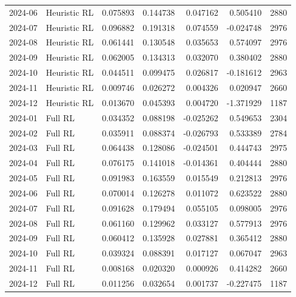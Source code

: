 \begin{tabular}{llrrrrr}
2024-06 & Heuristic RL & 0.075893 & 0.144738 & 0.047162 & 0.505410 & 2880 \\
2024-07 & Heuristic RL & 0.096882 & 0.191318 & 0.074559 & -0.024748 & 2976 \\
2024-08 & Heuristic RL & 0.061441 & 0.130548 & 0.035653 & 0.574097 & 2976 \\
2024-09 & Heuristic RL & 0.062005 & 0.134313 & 0.032070 & 0.380402 & 2880 \\
2024-10 & Heuristic RL & 0.044511 & 0.099475 & 0.026817 & -0.181612 & 2963 \\
2024-11 & Heuristic RL & 0.009746 & 0.026272 & 0.004326 & 0.020947 & 2660 \\
2024-12 & Heuristic RL & 0.013670 & 0.045393 & 0.004720 & -1.371929 & 1187 \\
2024-01 & Full RL & 0.034352 & 0.088198 & -0.025262 & 0.549653 & 2304 \\
2024-02 & Full RL & 0.035911 & 0.088374 & -0.026793 & 0.533389 & 2784 \\
2024-03 & Full RL & 0.064438 & 0.128086 & -0.024501 & 0.444743 & 2975 \\
2024-04 & Full RL & 0.076175 & 0.141018 & -0.014361 & 0.404444 & 2880 \\
2024-05 & Full RL & 0.091983 & 0.163559 & 0.015549 & 0.212813 & 2976 \\
2024-06 & Full RL & 0.070014 & 0.126278 & 0.011072 & 0.623522 & 2880 \\
2024-07 & Full RL & 0.091628 & 0.179494 & 0.055105 & 0.098005 & 2976 \\
2024-08 & Full RL & 0.061160 & 0.129962 & 0.033127 & 0.577913 & 2976 \\
2024-09 & Full RL & 0.060412 & 0.135928 & 0.027881 & 0.365412 & 2880 \\
2024-10 & Full RL & 0.039324 & 0.088391 & 0.017127 & 0.067047 & 2963 \\
2024-11 & Full RL & 0.008168 & 0.020320 & 0.000926 & 0.414282 & 2660 \\
2024-12 & Full RL & 0.011256 & 0.032654 & 0.001737 & -0.227475 & 1187 \\
\bottomrule
\end{tabular}
